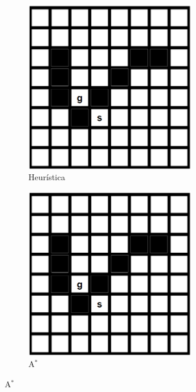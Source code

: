 \documentclass{article}
\begin{document}
\begin{enumerate}
\begin{enumerate}
     
     \begin{figure}
     \centering
     \begin{subfigure}[b]{0.45\textwidth}
         \centering
         \includegraphics[width=0.8\textwidth]{lab_1.png}
         \caption{Heurística}
         \label{fig:y equals x}
     \end{subfigure}
   \hfill
     \begin{subfigure}[b]{0.45\textwidth}
         \centering
         \includegraphics[width=0.8\textwidth]{lab_1.png}
         \caption{A$^*$}
         \label{fig:three sin x}
     \end{subfigure}
     \label{fig:three graphs}
     \end{figure}
        

\end{enumerate}
\end{enumerate}
\end{document}
